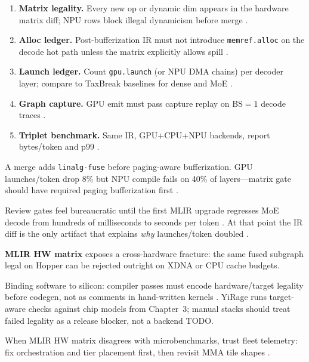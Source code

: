\begin{enumerate}
\item \textbf{Matrix legality.} Every new op or dynamic dim appears in the hardware matrix diff; NPU rows block illegal dynamicism before merge \citep{amd2024xdna,amd2024aie,yirage2026}.
\item \textbf{Alloc ledger.} Post-bufferization IR must not introduce \texttt{memref.alloc} on the decode hot path unless the matrix explicitly allows spill \citep{memoryfloor2026,kwon2023vllm,chen2020compilerbasedhardw}.
\item \textbf{Launch ledger.} Count \texttt{gpu.launch} (or NPU DMA chains) per decoder layer; compare to TaxBreak baselines for dense and MoE \citep{taxbreak2026,liu2024deepseekv3}.
\item \textbf{Graph capture.} GPU emit must pass capture replay on BS${=}1$ decode traces \citep{nvidia2024cudagraphs,memoryfloor2026}.
\item \textbf{Triplet benchmark.} Same IR, GPU+CPU+NPU backends, report bytes/token and p99 \citep{patel2025llminference,yirage2026,dlbook}.
\end{enumerate}

\begin{example}
A merge adds \texttt{linalg-fuse} before paging-aware bufferization. GPU launches/token drop 8\% but NPU compile fails on 40\% of layers---matrix gate should have required paging bufferization first \citep{kwon2023vllm,amd2024xdna,yirage2026,taxbreak2026}.
\end{example}

Review gates feel bureaucratic until the first MLIR upgrade regresses MoE decode from hundreds of milliseconds to seconds per token \citep{taxbreak2026,liu2024deepseekv3}. At that point the IR diff is the only artifact that explains \emph{why} launches/token doubled \citep{chen2020compilerbasedhardw,memoryfloor2026,nvidia2024cudagraphs}.

\textbf{MLIR HW matrix} exposes a cross-hardware fracture: the same fused subgraph legal on Hopper can be rejected outright on XDNA or CPU cache budgets.

Binding software to silicon: compiler passes must encode hardware/target legality before codegen, not as comments in hand-written kernels \citep{amd2024xdna,amd2024aie}. YiRage runs target-aware checks against chip models from Chapter~3; manual stacks should treat failed legality as a release blocker, not a backend TODO.

When MLIR HW matrix disagrees with microbenchmarks, trust fleet telemetry: fix orchestration and tier placement first, then revisit MMA tile shapes \citep{amd2024xdna,amd2024aie}.

